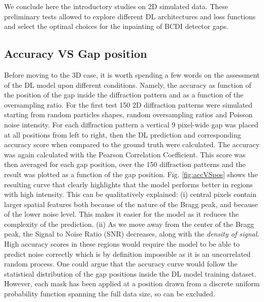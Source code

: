 We conclude here the introductory studies on 2D simulated data. These preliminary tests allowed to explore 
different DL architectures and loss functions and select the optimal choices for the inpainting of BCDI detector
gaps. 

\subsection{Accuracy VS Gap position}

Before moving to the 3D case, it is worth spending a few words on the assessment of the DL model upon different conditions.
Namely, the accuracy as function of the position of the gap inside the diffraction pattern and as a function of the oversampling ratio.
For the first test 150 2D diffraction patterns were simulated starting from random particles shapes, random oversampling ratios
and Poisson noise intensity. For each diffraction pattern a vertical 9 pixel-wide gap was placed at all positions
from left to right, then the DL prediction and corresponding accuracy score when compared to the ground truth were calculated. The 
accuracy was again calculated with the Pearson Correlation Coefficient. This score was then averaged for each 
gap position, over the 150 diffraction patterns and the result was plotted as a function of the gap position. Fig. \ref{fig:accVSpos} 
shows the resulting curve that clearly highlights that the model performs better in regions with high intensity. 
This can be qualitatively explained: (i) central pixels contain larger spatial features both because of the 
nature of the Bragg peak, and because of the lower noise level. This makes it easier for the model as it reduces the 
complexity of the prediction. (ii) As we move away from the center of the Bragg peak, the Signal to Noise Ratio (SNR) 
decreases, along with the \textit{density of signal}. High accuracy scores in these regions would require the model to be 
able to predict noise correctly which is by definition impossible as it is an uncorrelated random process. One could argue 
that the accuracy curve would follow the statistical distribution of the gap positions inside the DL model training dataset.
However, each mask has been applied at a position drawn from a discrete uniform probability function spanning the full
data size, so can be excluded. 

